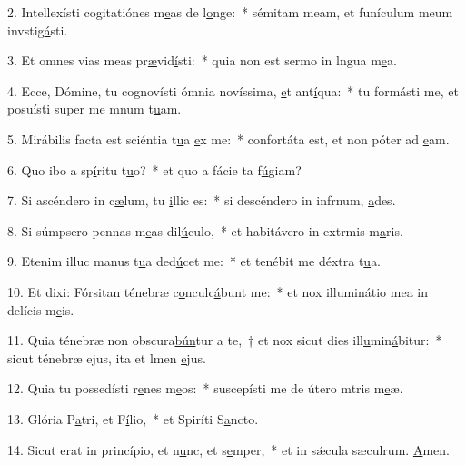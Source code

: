 2. Intellexísti cogitatiónes m\uline{e}as de l\uline{o}nge:~* sémitam meam, et funículum meum invstig\uline{á}sti.\par 
3. Et omnes vias meas pr\uline{æ}vid\uline{í}sti:~* quia non est sermo in lngua m\uline{e}a.\par 
4. Ecce, Dómine, tu cognovísti ómnia novíssima, \uline{e}t ant\uline{í}qua:~* tu formásti me, et posuísti super me mnum t\uline{u}am.\par 
5. Mirábilis facta est sciéntia t\uline{u}a \uline{e}x me:~* confortáta est, et non póter ad \uline{e}am.\par 
6. Quo ibo a sp\uline{í}ritu t\uline{u}o?~* et quo a fácie ta f\uline{ú}giam?\par 
7. Si ascéndero in c\uline{æ}lum, tu \uline{i}llic es:~* si descéndero in infrnum, \uline{a}des.\par 
8. Si súmpsero pennas m\uline{e}as dil\uline{ú}culo,~* et habitávero in extrmis m\uline{a}ris.\par 
9. Etenim illuc manus t\uline{u}a ded\uline{ú}cet me:~* et tenébit me déxtra t\uline{u}a.\par 
10. Et dixi: Fórsitan ténebræ c\uline{o}nculc\uline{á}bunt me:~* et nox illuminátio mea in delícis m\uline{e}is.\par 
11. Quia ténebræ non obscura\uline{bún}tur a te,~† et nox sicut dies ill\uline{u}min\uline{á}bitur:~* sicut ténebræ ejus, ita et lmen \uline{e}jus.\par 
12. Quia tu possedísti r\uline{e}nes m\uline{e}os:~* suscepísti me de útero mtris m\uline{e}æ.\par 
13. Glória P\uline{a}tri, et F\uline{í}lio,~* et Spiríti S\uline{a}ncto.\par 
14. Sicut erat in princípio, et n\uline{u}nc, et s\uline{e}mper,~* et in sǽcula sæculrum. \uline{A}men.\par 

